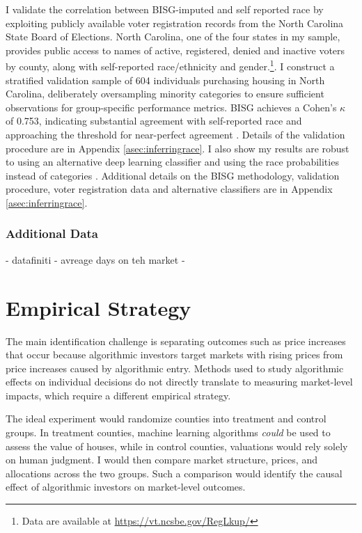 \documentclass[11pt]{article}
\newcommand{\LR}[1]{{\color{blue}{[LR: #1]}}}
\begin{document}
I validate the correlation between BISG-imputed and self reported race by exploiting publicly available voter registration records from the North Carolina State Board of Elections. North Carolina, one of the four states in my sample, provides public access to names of active, registered, denied and inactive voters by county, along with self-reported race/ethnicity and gender.\footnote{Data are available at \url{https://vt.ncsbe.gov/RegLkup/}}. I construct a stratified validation sample of 604 individuals purchasing housing in North Carolina, deliberately oversampling minority categories to ensure sufficient observations for group-specific performance metrics. BISG achieves a Cohen's $\kappa$ of 0.753, indicating substantial agreement with self-reported race and approaching the threshold for near-perfect agreement \citep{landis_measurement_1977, mchugh_interrater_2012}. Details of the validation procedure are in Appendix \ref{asec:inferringrace}. I also show my results are robust to using an alternative deep learning classifier and using the race probabilities instead of categories \LR{CITE APPENDIX TABLES}. Additional details on the BISG methodology, validation procedure, voter registration data and alternative classifiers are in Appendix \ref{asec:inferringrace}.

\subsubsection{Additional Data}
- datafiniti 
- avreage days on teh market 
- 


\section{Empirical Strategy}
The main identification challenge is separating outcomes such as price increases that occur because algorithmic investors target markets with rising prices from price increases caused by algorithmic entry. Methods used to study algorithmic effects on individual decisions do not directly translate to measuring market-level impacts, which require a different empirical strategy.

The ideal experiment would randomize counties into  treatment and control groups. In treatment counties, machine learning algorithms \textit{could} be used to assess the value of houses, while in control counties, valuations would rely solely on human judgment. I would then compare market structure, prices, and allocations across the two groups. Such a comparison would identify the causal effect of algorithmic investors on market-level outcomes.
\end{document}
